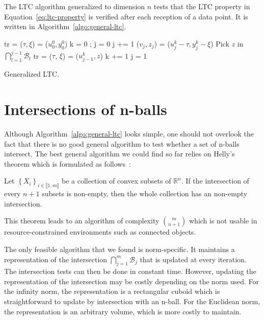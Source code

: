 The LTC algorithm generalized to dimension $n$ tests that the LTC  property in
Equation~\ref{eq:ltc-property} is verified after each reception of a data
point. It is written in Algorithm~\ref{algo:general-ltc}.
\begin{algorithm}
\begin{algorithmic}[1]
\Input
\EndInput
\Output
\EndOutput

\State tr = ($\tau, \xi$) = ($u^0_0, y^0_0$) 
\State k = 0 ; j = 0
    \State j += 1
    \State ($v_j, z_j$) = ($u_j^k - \tau, y_j^k - \xi$)
        \State Pick $z$ in $\bigcap_{l=1}^{j-1}{\mathcal{B}_l}$ 
        \State tr = ($\tau$, $\xi$) = ($u^k_{j-1}, z$)
        \State k += 1
        \State j = 1
    \EndIf
\EndWhile
\end{algorithmic}
\caption{Generalized LTC.}
\label{algo:general-ltc}
\end{algorithm}

\section{Intersections of n-balls}

Although Algorithm~\ref{algo:general-ltc} looks simple, one should not
overlook the fact that there is no good general algorithm to test
whether a set of n-balls intersect. The best general algorithm we could find
so far relies on Helly's theorem which is formulated as follows~\cite{helly1923mengen}:
\begin{theorem}
Let $\left\{ X_i \right\}_{i \in \llbracket 1, m \rrbracket}$ be a collection of
convex subsets of $\mathbb{R}^n$. If the intersection of every $n+1$ subsets is
non-empty, then the whole collection has an non-empty intersection.
\end{theorem}
\noindent This theorem leads to an algorithm of complexity ${m \choose n+1}$
which is not usable in resource-constrained environments such as connected
objects.

The only feasible algorithm that we found is norm-specific. It
maintains a representation of the intersection
$\bigcap_{j=1}^{m}{\mathcal{B}_j}$ that is updated at every iteration.
The intersection tests can then be done in constant time. However,
updating the representation of the intersection may be costly
depending on the norm used. For the infinity norm, the representation
is a rectangular cuboid which is straightforward to update by
intersection with an n-ball.
For the Euclidean norm, the representation is an arbitrary volume,
which is more costly to maintain.

